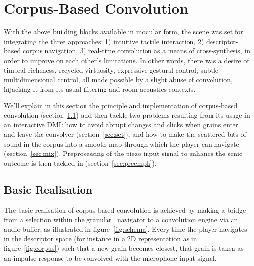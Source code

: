 \section{Corpus-Based Convolution} %

With the above building blocks available in modular form, the scene was set for integrating the three approaches: 1) intuitive tactile interaction, 2) descriptor-based corpus navigation, 3) real-time convolution as a means of cross-synthesis, in order to improve on each other's limitations. In other words, there was a desire of timbral richeness, recycled virtuosity, expressive gestural control, subtle multidimensional control, all made possible by a slight abuse of convolution, hijacking it from its usual filtering and room acoustics contexts.

We'll explain in this section the principle and implementation of corpus-based convolution (section~\ref{sec:basic}) and then tackle two problems resulting from its usage in an interactive DMI: 
how to avoid abrupt changes and clicks when grains enter and leave the convolver (section~\ref{sec:set}), and
how to make the scattered bits of sound in the corpus into a smooth map through which the player can navigate (section~\ref{sec:mix}). Preprocessing of the piezo input signal to enhance the sonic outcome is then tackled in (section~\ref{sec:preemph}).

\subsection{Basic Realisation}\label{sec:basic}


The basic realisation of corpus-based convolution is achieved by making a bridge from a selection within the granular \cbcs\ navigator to a convolution engine via an audio buffer, as illustrated in figure~\ref{fig:schema}.  Every time the player navigates in the descriptor space (for instance in a 2D representation as in figure~\ref{fig:corpus}) such that a new grain becomes closest, that grain is taken as an impulse response to be convolved with the microphone input signal.

